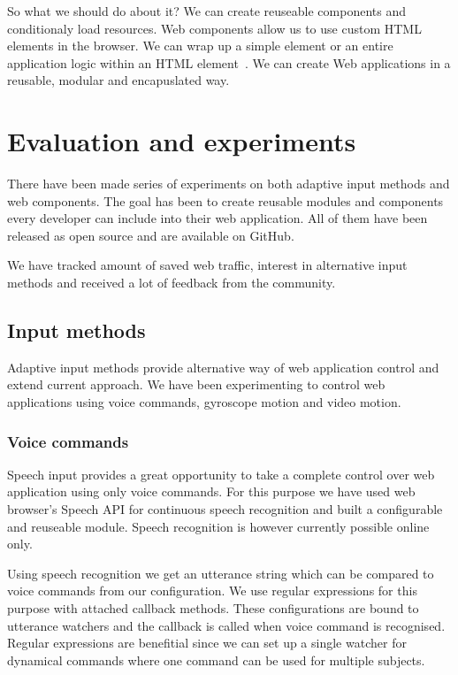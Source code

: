 \documentclass{iitsrc}
\begin{document}
So what we should do about it? We can create reuseable components and conditionaly load resources. Web components allow us to use custom HTML elements in the browser. We can wrap up a simple element or an entire application logic within an HTML element~\cite{webcomponents}. We can create Web applications in a reusable, modular and encapuslated way.


\section{Evaluation and experiments} %
\label{sec:evaluation_and_experiments}

There have been made series of experiments on both adaptive input methods and web components. The goal has been to create reusable modules and components every developer can include into their web application. All of them have been released as open source and are available on GitHub.

We have tracked amount of saved web traffic, interest in alternative input methods and received a lot of feedback from the community.

\subsection{Input methods} %
\label{sub:input_methods}

Adaptive input methods provide alternative way of web application control and extend current approach. We have been experimenting to control web applications using voice commands, gyroscope motion and video motion.

\subsubsection{Voice commands} %
\label{ssub:voice_commands}

Speech input provides a great opportunity to take a complete control over web application using only voice commands. For this purpose we have used web browser's Speech API for continuous speech recognition and built a configurable and reuseable module. Speech recognition is however currently possible online only.

Using speech recognition we get an utterance string which can be compared to voice commands from our configuration. We use regular expressions for this purpose with attached callback methods. These configurations are bound to utterance watchers and the callback is called when voice command is recognised. Regular expressions are benefitial since we can set up a single watcher for dynamical commands where one command can be used for multiple subjects.
\end{document}
